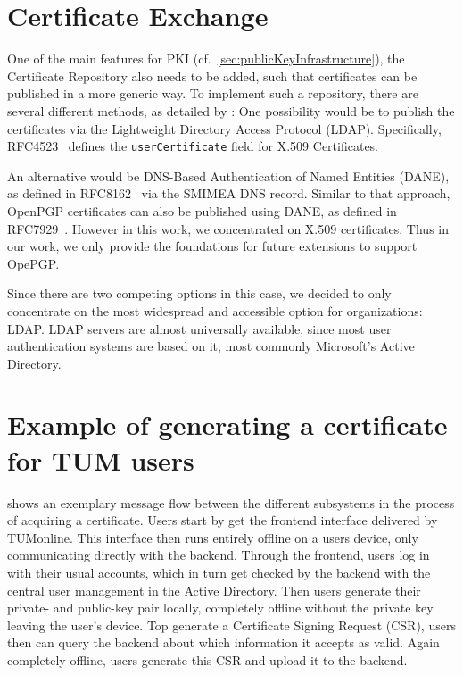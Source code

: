 \section{Certificate Exchange}\label{sec:certificateExchange}
One of the main features for PKI (cf.~\ref{sec:publicKeyInfrastructure}), the Certificate Repository also needs to be
added, such that certificates can be published in a more generic way.
To implement such a repository, there are several different methods, as detailed by
\citet{hauner2016interoperability}:
One possibility would be to publish the certificates via the Lightweight Directory Access Protocol (LDAP).
Specifically, RFC4523~\cite{RFC4523} defines the \lstinline{userCertificate} field for X.509 Certificates.

An alternative would be DNS-Based Authentication of Named Entities (DANE), as defined in RFC8162~\cite{RFC8162} via the
SMIMEA DNS record.
Similar to that approach, OpenPGP certificates can also be published using DANE, as defined in RFC7929~\cite{RFC7929}.
However in this work, we concentrated on X.509 certificates.
Thus in our work, we only provide the foundations for future extensions to support OpePGP\@.

Since there are two competing options in this case, we decided to only concentrate on the most widespread and accessible
option for organizations: LDAP\@.
LDAP servers are almost universally available, since most user authentication systems are based on it, most commonly
Microsoft's Active Directory.

\section*{Example of generating a certificate for TUM users}

 shows an exemplary message flow between the different subsystems in the process of acquiring
a certificate.
Users start by get the frontend interface delivered by TUMonline.
This interface then runs entirely offline on a users device, only communicating directly with the backend.
Through the frontend, users log in with their usual accounts, which in turn get checked by the backend with
the central user management in the Active Directory.
Then users generate their private- and public-key pair locally, completely offline without the private key leaving the
user's device.
Top generate a Certificate Signing Request (CSR), users then can query the backend about which information it accepts as
valid.
Again completely offline, users generate this CSR and upload it to the backend.

